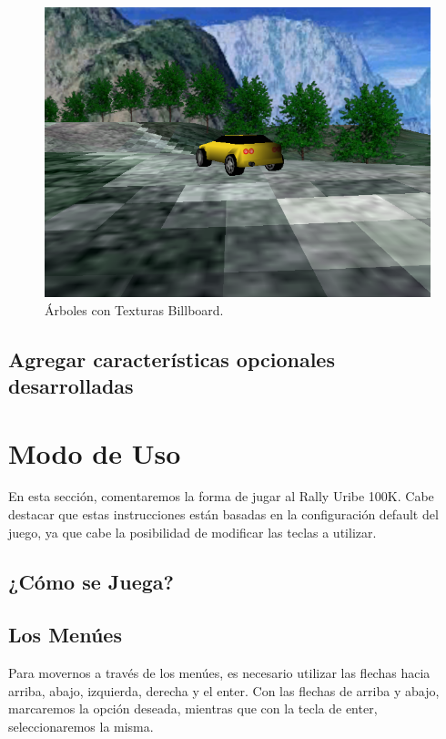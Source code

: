 \documentclass[a4paper,10pt]{article}
\begin{document}
\begin{figure}
 \centering
 \includegraphics[scale=0.4]{./billboard.png}
 \caption{Árboles con Texturas Billboard.}
 \label{fig:figure7}
\end{figure}


\subsection{Agregar características opcionales desarrolladas}

\section{Modo de Uso}
\label{mododeuso}
En esta sección, comentaremos la forma de jugar al Rally Uribe 100K.  Cabe
destacar que estas instrucciones están basadas en la configuración default del
juego, ya que cabe la posibilidad de modificar las teclas a utilizar.

\subsection{¿Cómo se Juega?}

\subsection{Los Menúes}
Para movernos a través de los menúes, es necesario utilizar las flechas hacia
arriba, abajo, izquierda, derecha y el enter.  Con las flechas de arriba y
abajo, marcaremos la opción deseada, mientras que con la tecla de enter,
seleccionaremos la misma.
\end{document}
